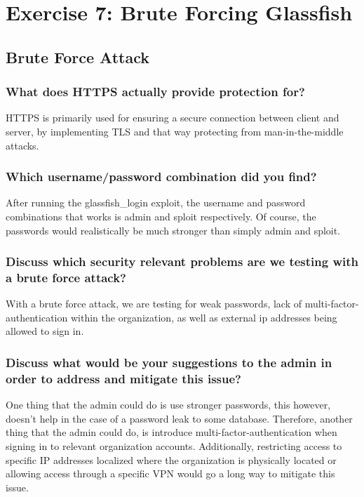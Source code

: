 \section{Exercise 7: Brute Forcing Glassfish}
\subsection{Brute Force Attack}
\subsubsection{What does HTTPS actually provide protection for?}
HTTPS is primarily used for ensuring a secure connection between client and server, by implementing TLS and that way protecting from man-in-the-middle attacks.
\subsubsection{Which username/password combination did you find?}
After running the glassfish\_login exploit, the username and password combinations that works is admin and sploit respectively. Of course, the passwords would realistically be much stronger than simply admin and sploit.

\subsubsection{Discuss which security relevant problems are we
    testing with a brute force attack?}
With a brute force attack, we are testing for weak passwords, lack of multi-factor-authentication within the organization, as well as external ip addresses being allowed to sign in.
\subsubsection{Discuss what would be your suggestions to the admin
    in order to address and mitigate this issue?}
One thing that the admin could do is use stronger passwords, this however, doesn't help in the case of a password leak to some database. Therefore, another thing that the admin could do, is introduce multi-factor-authentication when signing in to relevant organization accounts. Additionally, restricting access to specific IP addresses localized where the organization is physically located or allowing access through a specific VPN would go a long way to mitigate this issue.
